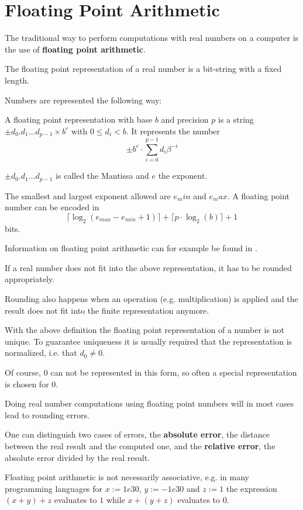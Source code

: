 \section{Floating Point Arithmetic}
The traditional way to perform computations with real numbers on a computer is the use 
of \textbf{floating point arithmetic}. 

The floating point representation of a real number is a bit-string with a fixed
length.

Numbers are represented the following way:
\begin{definition}\label{def: floating point number}
	A floating point representation with base $b$ and precision $p$
	is a string $\pm d_0 . d_1 \dots d_{p-1} \times b^e$ with $0 \leq d_i < b$.	
	It represents the number
	$$ \pm b^e \cdot \sum_{i=0}^{p-1} d_i\beta^{-i} $$ 

	$\pm d_0 . d_1 \dots d_{p-1}$ is called the Mantissa and $e$ the exponent.
	
	The smallest and largest exponent allowed are $e_min$ and $e_max$.
	A floating point number can be encoded in
	$$ \lceil \log_2(e_{max}-e_{min}+1) \rceil + \lceil  p \cdot \log_2 (b) \rceil + 1 $$
	bits.
\end{definition}

Information on floating point arithmetic can for example be found in
\cite{Goldberg1991}.

If a real number does not fit into the above representation, it has to be
rounded appropriately.

Rounding also happens when an operation (e.g. multiplication) is applied and
the result does not fit into the finite representation anymore.

With the above definition the floating point representation of a number is not
unique. 
To guarantee uniqueness it is usually required that the representation  is
normalized, i.e. that $d_0 \neq 0$. 

Of course, $0$ can not be represented in this form, so often a special
representation is chosen for $0$.

Doing real number computations using floating point numbers will in most cases
lead to rounding errors.

One can distinguish two cases of errors, the \textbf{absolute error}, the
distance between the real result and the computed one, and the \textbf{relative
error}, the absolute error divided by the real result.

Floating point arithmetic is not necessarily associative, e.g. in many
programming languages for $x := 1e30$, $y := -1e30$ and $z := 1$ the expression
$(x+y)+z$ evaluates to $1$ while $x+(y+z)$ evaluates to $0$.

